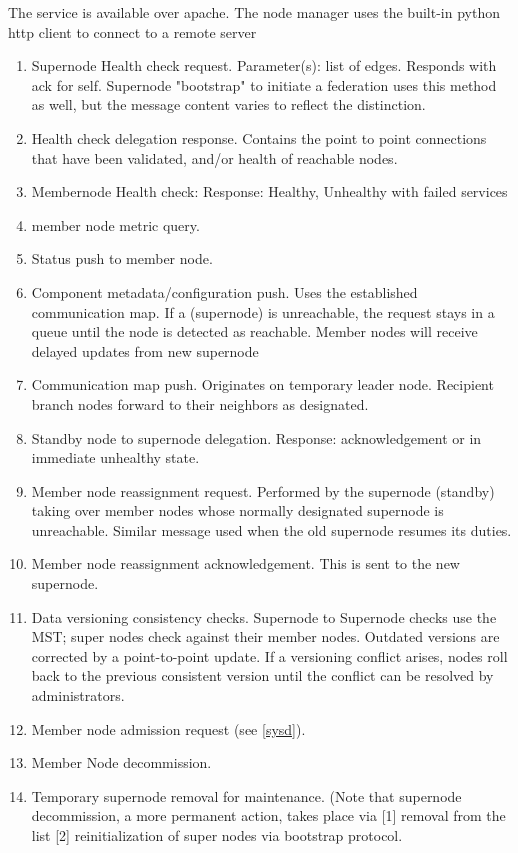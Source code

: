 \documentclass[oneside,12pt]{memoir}
\begin{document}
The service is available over apache. The node manager uses the built-in python http client to connect to a remote server

\begin{enumerate}
\item
Supernode Health check request.  Parameter(s): list of edges.  Responds with ack for self.  Supernode "bootstrap" to initiate a federation uses this method as well, but the message content varies to reflect the distinction. 

\item
Health check delegation response.  Contains the point to point connections that have been validated, and/or health of reachable nodes.

\item
Membernode Health check:  Response: Healthy, Unhealthy with failed services
\item
member node metric query.
\item
Status push to member node.
\item
Component metadata/configuration push.  Uses the established communication map.  If a (supernode) is unreachable, the request stays in a queue until the node is detected as reachable.  Member nodes will receive delayed updates from new supernode
\item
Communication map push.  Originates on temporary leader node.  Recipient branch nodes forward to their neighbors as designated.
\item
Standby node to supernode delegation.  Response: acknowledgement or in immediate unhealthy state.
\item
Member node reassignment request.  Performed by the supernode (standby) taking over member nodes whose normally designated supernode is unreachable.   Similar message used when the old supernode resumes its duties.
\item
Member node reassignment acknowledgement.  This is sent to the new supernode.
\item
Data versioning consistency checks.  Supernode to Supernode checks use the MST; super nodes check against their member nodes. Outdated versions are corrected by a point-to-point update.  If a versioning conflict arises, nodes roll back to the previous consistent version until the conflict can be resolved by administrators.
\item
Member node admission request (see \ref{sysd}).   
\item
Member Node decommission. 
\item 
Temporary supernode removal for maintenance.  (Note that supernode decommission, a more permanent action, takes place via [1] removal from the list [2] reinitialization of super nodes via bootstrap protocol.

\end{enumerate}
\end{document}
